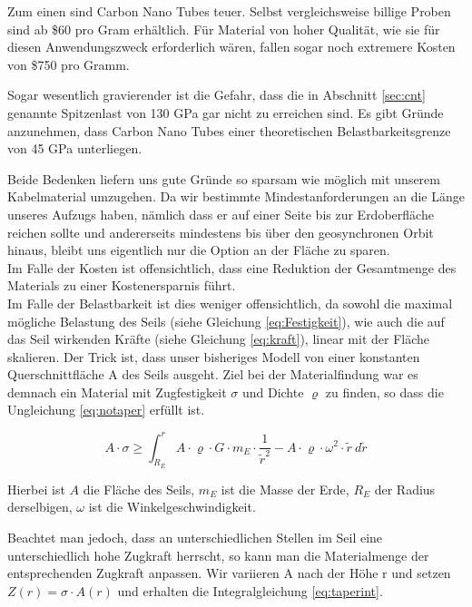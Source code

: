 \documentclass[a4paper, 10pt]{report}
\begin{document}
Zum einen sind Carbon Nano Tubes teuer. Selbst vergleichsweise billige Proben sind ab \$60 pro Gram erhältlich. Für Material von hoher Qualität, wie sie für diesen Anwendungszweck erforderlich wären, fallen sogar noch extremere Kosten von \$750 pro Gramm\cite{baughman2002carbon}.

Sogar wesentlich gravierender ist die Gefahr, dass die in Abschnitt \ref{sec:cnt} genannte Spitzenlast von 130 GPa gar nicht zu erreichen sind. Es gibt Gründe anzunehmen, dass Carbon Nano Tubes einer theoretischen Belastbarkeitsgrenze von 45 GPa unterliegen\cite{pugno2007space}.

Beide Bedenken liefern uns gute Gründe so sparsam wie möglich mit unserem Kabelmaterial umzugehen. Da wir bestimmte Mindestanforderungen an die Länge unseres Aufzugs haben, nämlich dass er auf einer Seite bis zur Erdoberfläche reichen sollte und andererseits mindestens bis über den geosynchronen Orbit hinaus, bleibt uns eigentlich nur die Option an der Fläche zu sparen.\\
Im Falle der Kosten ist offensichtlich, dass eine Reduktion der Gesamtmenge des Materials zu einer Kostenersparnis führt.\\
Im Falle der Belastbarkeit ist dies weniger offensichtlich, da sowohl die maximal mögliche Belastung des Seils (siehe Gleichung \ref{eq:Festigkeit}), wie auch die auf das Seil wirkenden Kräfte (siehe Gleichung \ref{eq:kraft}), linear mit der Fläche skalieren. Der Trick ist, dass unser bisheriges Modell von einer konstanten Querschnittfläche A des Seils ausgeht. Ziel bei der Materialfindung war es demnach ein Material mit Zugfestigkeit $\sigma$ und Dichte $\varrho$ zu finden, so dass die Ungleichung \ref{eq:notaper} erfüllt ist.

\begin{equation}
A \cdot \sigma \geq \int_{R_E}^{r} A \cdot \varrho \cdot G \cdot m_E \cdot \frac{1}{\tilde{r}^2} - A \cdot \varrho \cdot \omega^2 \cdot \tilde{r}\ d\tilde{r}
\label{eq:notaper}
\end{equation}

Hierbei ist $A$ die Fläche des Seils, $m_E$ ist die Masse der Erde, $R_E$ der Radius derselbigen, $\omega$ ist die Winkelgeschwindigkeit.

Beachtet man jedoch, dass an unterschiedlichen Stellen im Seil eine unterschiedlich hohe Zugkraft herrscht, so kann man die Materialmenge der entsprechenden Zugkraft anpassen.
Wir variieren A nach der Höhe r und setzen $Z(r) = \sigma \cdot A(r)$ und erhalten die Integralgleichung \ref{eq:taperint}.
\end{document}
